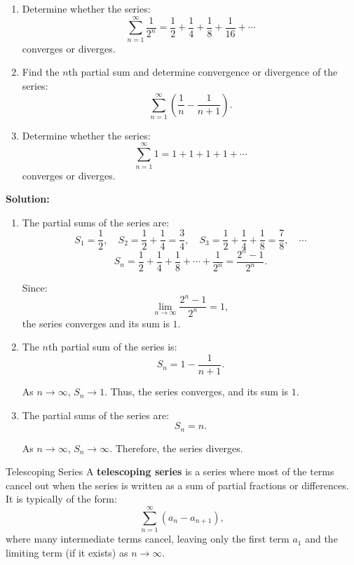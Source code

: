 \documentclass[12pt]{article}
\theoremstyle{beautifulthm}
\begin{document}
\begin{tcolorbox}[colback=examplebg, colframe=red!75!black, title=\textbf{EXAMPLE 8: Convergent and Divergent Series}, fonttitle=\bfseries, sharp corners]

\begin{enumerate}
    \item Determine whether the series:
    \[
    \sum_{n=1}^\infty \frac{1}{2^n} = \frac{1}{2} + \frac{1}{4} + \frac{1}{8} + \frac{1}{16} + \cdots
    \]
    converges or diverges.

    \item Find the $n$th partial sum and determine convergence or divergence of the series:
    \[
    \sum_{n=1}^\infty \left( \frac{1}{n} - \frac{1}{n+1} \right).
    \]

    \item Determine whether the series:
    \[
    \sum_{n=1}^\infty 1 = 1 + 1 + 1 + 1 + \cdots
    \]
    converges or diverges.
\end{enumerate}

\tcblower
\textbf{Solution:} 

\begin{enumerate}
    \item The partial sums of the series are:
    \[
    S_1 = \frac{1}{2}, \quad S_2 = \frac{1}{2} + \frac{1}{4} = \frac{3}{4}, \quad S_3 = \frac{1}{2} + \frac{1}{4} + \frac{1}{8} = \frac{7}{8}, \quad \cdots
    \]
    \[
    S_n = \frac{1}{2} + \frac{1}{4} + \frac{1}{8} + \cdots + \frac{1}{2^n} = \frac{2^n - 1}{2^n}.
    \]

    Since:
    \[
    \lim_{n \to \infty} \frac{2^n - 1}{2^n} = 1,
    \]
    the series converges and its sum is $1$.

    \item The $n$th partial sum of the series is:
    \[
    S_n = 1 - \frac{1}{n+1}.
    \]

    As $n \to \infty$, $S_n \to 1$. Thus, the series converges, and its sum is $1$.

    \item The partial sums of the series are:
    \[
    S_n = n.
    \]

    As $n \to \infty$, $S_n \to \infty$. Therefore, the series diverges.
\end{enumerate}
\end{tcolorbox}

\begin{Definition}{Telescoping Series}{}
    A \textbf{telescoping series} is a series where most of the terms cancel out when the series is written as a sum of partial fractions or differences. It is typically of the form:
\[
\sum_{n=1}^\infty (a_n - a_{n+1}),
\]
where many intermediate terms cancel, leaving only the first term $a_1$ and the limiting term (if it exists) as $n \to \infty$.
\end{Definition}
\end{document}
